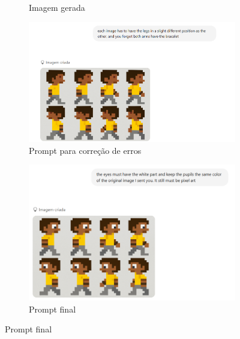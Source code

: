 \begin{figure}[htbp]
\begin{subfigure}{0.2\linewidth}
        \caption{\small Imagem gerada}
        \label{fig:chatGPT4b}
    \end{subfigure}
    \begin{subfigure}{0.65\linewidth}
        \includegraphics[width=1\linewidth]{figs/chatGPT/walking_cycle/front_view/tela2.PNG}
        \caption{\small Prompt para correção de erros}
        \label{fig:chatGPT4c}
    \end{subfigure}
        \begin{subfigure}{0.55\linewidth}
        \includegraphics[width=1\linewidth]{figs/chatGPT/walking_cycle/front_view/tela3.PNG}
        \caption{\small Prompt final}
        \label{fig:chatGPT4d}
    \end{subfigure}

\end{figure}

